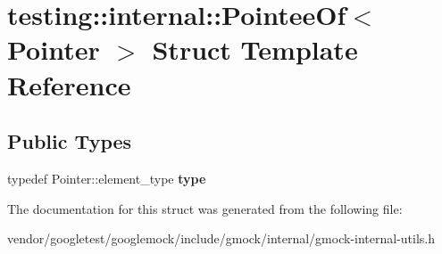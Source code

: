 \hypertarget{structtesting_1_1internal_1_1PointeeOf}{}\section{testing\+:\+:internal\+:\+:Pointee\+Of$<$ Pointer $>$ Struct Template Reference}
\label{structtesting_1_1internal_1_1PointeeOf}
\subsection*{Public Types}
\begin{DoxyCompactItemize}
\item 
typedef Pointer\+::element\+\_\+type {\bfseries type}\hypertarget{structtesting_1_1internal_1_1PointeeOf_aca4d92c8f978e47a8695e82cffc11837}{}\label{structtesting_1_1internal_1_1PointeeOf_aca4d92c8f978e47a8695e82cffc11837}

\end{DoxyCompactItemize}


The documentation for this struct was generated from the following file\+:\begin{DoxyCompactItemize}
\item 
vendor/googletest/googlemock/include/gmock/internal/gmock-\/internal-\/utils.\+h\end{DoxyCompactItemize}
